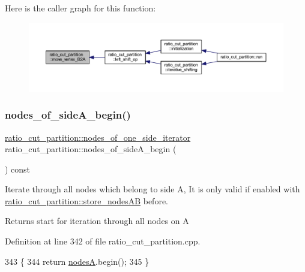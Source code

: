 Here is the caller graph for this function\+:\nopagebreak
\begin{figure}[H]
\begin{center}
\leavevmode
\includegraphics[width=350pt]{classratio__cut__partition_ab192d7130a80b6acf7da704162c51e6c_icgraph}
\end{center}
\end{figure}
\mbox{\label{classratio__cut__partition_a0c569bb7bd0a94269bd8938a2e0fce85}} 
\subsubsection{\texorpdfstring{nodes\+\_\+of\+\_\+side\+A\+\_\+begin()}{nodes\_of\_sideA\_begin()}}
{\footnotesize\ttfamily \mbox{\hyperlink{classratio__cut__partition_af438a591f6559b479bf40e9ac9cfcf0e}{ratio\+\_\+cut\+\_\+partition\+::nodes\+\_\+of\+\_\+one\+\_\+side\+\_\+iterator}} ratio\+\_\+cut\+\_\+partition\+::nodes\+\_\+of\+\_\+side\+A\+\_\+begin (\begin{DoxyParamCaption}{ }\end{DoxyParamCaption}) const}

Iterate through all nodes which belong to side {\ttfamily A}, It is only valid if enabled with \mbox{\hyperlink{classratio__cut__partition_af0efdeab02cb235df47e2339c196051f}{ratio\+\_\+cut\+\_\+partition\+::store\+\_\+nodes\+AB}} before.

\begin{DoxyReturn}{Returns}
start for iteration through all nodes on {\ttfamily A} 
\end{DoxyReturn}


Definition at line 342 of file ratio\+\_\+cut\+\_\+partition.\+cpp.


\begin{DoxyCode}
343 \{
344     \textcolor{keywordflow}{return} \mbox{\hyperlink{classratio__cut__partition_a871cc6bf77000205fec8ab6d3a28fc28}{nodesA}}.begin();
345 \}
\end{DoxyCode}
\mbox{\label{classratio__cut__partition_a497d63a55cf326f62b97d0c77be094c7}} 

